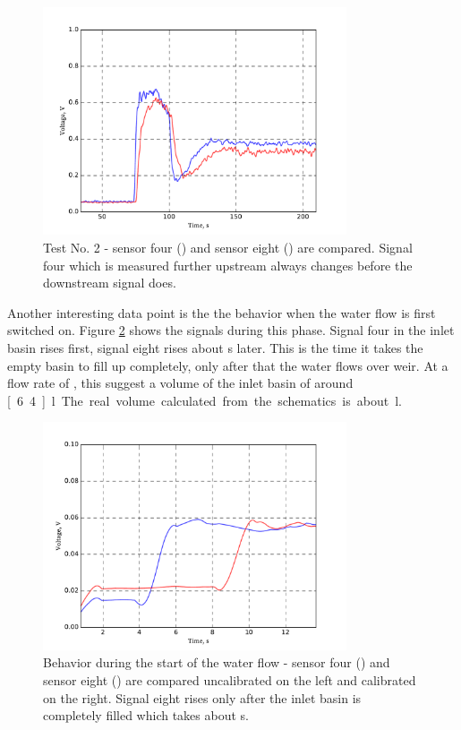 \begin{figure}[H]
	\begin{center}
		\includegraphics[width=0.8\textwidth]{images/log080716_2.pdf} 
		\caption{Test No. 2 - sensor four (\drawline[blue]) and sensor eight (\drawline[red]) are compared. Signal four which is measured further upstream always changes before the downstream signal does.}
		\label{fig:test2}
	\end{center}
\end{figure}

Another interesting data point is the the behavior when the water flow is first switched on. Figure \ref{fig:test2_on} shows the signals during this phase. Signal four in the inlet basin rises first, signal eight rises about \unit[4]{s} later. This is the time it takes the empty basin to fill up completely, only after that the water flows over weir. At a flow rate of , this suggest a volume of the inlet basin of around \unit[6.4]{l}. The real volume calculated from the schematics is about \unit[6]{l}.

\begin{figure}[H]
	\begin{center}
		\includegraphics[width=0.8\textwidth]{images/log080716_2_on.pdf} 
		\caption{Behavior during the start of the water flow - sensor four (\drawline[blue]) and sensor eight (\drawline[red]) are compared uncalibrated on the left and calibrated on the right. Signal eight rises only after the inlet basin is completely filled which takes about \unit[4]{s}.}
		\label{fig:test2_on}
	\end{center}
\end{figure}

